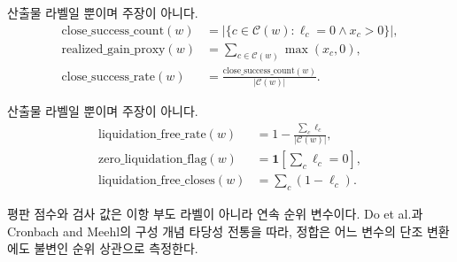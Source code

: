 
산출물 라벨일 뿐이며 주장이 아니다.
\begin{align}
\mathrm{close\_success\_count}(w)
&=
\bigl|\{c\in\mathcal{C}(w):\ell_c=0\land x_c>0\}\bigr|,
\label{eq:success-count}\\
\mathrm{realized\_gain\_proxy}(w)
&=
\sum_{c\in\mathcal{C}(w)} \max(x_c,0),
\label{eq:realized-gain}\\
\mathrm{close\_success\_rate}(w)
&=
\frac{\mathrm{close\_success\_count}(w)}{|\mathcal{C}(w)|}.
\label{eq:success-rate}
\end{align}


산출물 라벨일 뿐이며 주장이 아니다.
\begin{align}
\mathrm{liquidation\_free\_rate}(w)
&=
1-\frac{\sum_c \ell_c}{|\mathcal{C}(w)|},
\label{eq:liq-free-rate}\\
\mathrm{zero\_liquidation\_flag}(w)
&=
\mathbf{1}\!\left[\sum_c \ell_c=0\right],
\label{eq:zero-liq}\\
\mathrm{liquidation\_free\_closes}(w)
&=
\sum_c (1-\ell_c).
\label{eq:liq-free-closes}
\end{align}


평판 점수와 검사 값은 이항 부도 라벨이 아니라 연속 순위 변수이다. Do et al.과 Cronbach and Meehl의 구성 개념 타당성 전통을 따라, 정합은 어느 변수의 단조 변환에도 불변인 순위 상관으로 측정한다.

